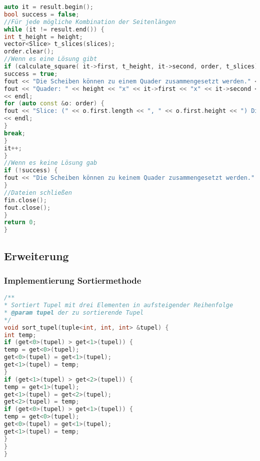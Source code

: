 \documentclass[a4paper,10pt,ngerman]{scrartcl}
\begin{document}
\begin{lstlisting}[frame=single,language=C++,title=Methode main,breaklines=true,label={lst:code_main}]
auto it = result.begin();
bool success = false;
//Für jede mögliche Kombination der Seitenlängen
while (it != result.end()) {
int t_height = height;
vector<Slice> t_slices(slices);
order.clear();
//Wenn es eine Lösung gibt
if (calculate_square( it->first, t_height, it->second, order, t_slices)) {
success = true;
fout << "Die Scheiben können zu einem Quader zusammengesetzt werden." << endl;
fout << "Quader: " << height << "x" << it->first << "x" << it->second << " V(" << volume << ")" << endl
<< endl;
for (auto const &o: order) {
fout << "Slice: (" << o.first.length << ", " << o.first.height << ") Dimension: " << to_string(o.second)
<< endl;
}
break;
}
it++;
}
//Wenn es keine Lösung gab
if (!success) {
fout << "Die Scheiben können zu keinem Quader zusammengesetzt werden." << endl;
}
//Dateien schließen
fin.close();
fout.close();
}
return 0;
}
    \end{lstlisting}

    \subsection{Erweiterung}\label{subsec:erweiterung}
    \subsubsection{Implementierung Sortiermethode}

    \begin{lstlisting}[frame=single,language=C++,title=Methode sort\_tupel,breaklines=true,label={lst:code_sortTupel}]
/**
* Sortiert Tupel mit drei Elementen in aufsteigender Reihenfolge
* @param tupel der zu sortierende Tupel
*/
void sort_tupel(tuple<int, int, int> &tupel) {
int temp;
if (get<0>(tupel) > get<1>(tupel)) {
temp = get<0>(tupel);
get<0>(tupel) = get<1>(tupel);
get<1>(tupel) = temp;
}
if (get<1>(tupel) > get<2>(tupel)) {
temp = get<1>(tupel);
get<1>(tupel) = get<2>(tupel);
get<2>(tupel) = temp;
if (get<0>(tupel) > get<1>(tupel)) {
temp = get<0>(tupel);
get<0>(tupel) = get<1>(tupel);
get<1>(tupel) = temp;
}
}
}
    \end{lstlisting}

    \newpage
\end{document}
